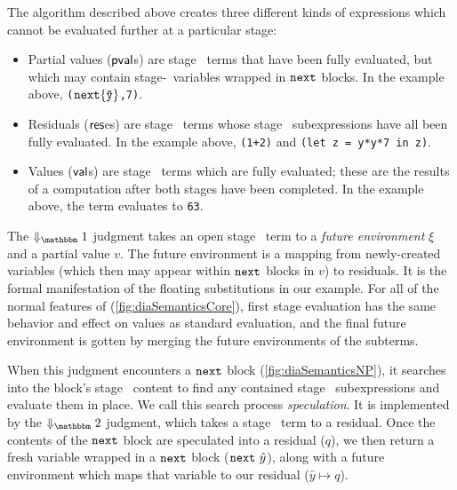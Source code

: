 
The algorithm described above creates three different kinds of expressions which
cannot be evaluated further at a particular stage:
\begin{itemize}
\item 
Partial values ($\mathsf{pval}$s) are stage \bbone\ terms that have been fully evaluated, 
but which may contain stage-\bbtwo\ variables wrapped in ${\tt next}$ blocks. 
In the example above, 
\verb|(|${\tt next} \{\mathtt{\hat y}\}$\verb|,7)|.
\item Residuals ($\mathsf{res}$es) are stage \bbtwo\ terms whose stage \bbone\
subexpressions have all been fully evaluated. In the example above,
\verb|(1+2)| and \verb|(let z = y*y*7 in z)|.
\item Values ($\mathsf{val}$s) are stage \bbtwo\ terms which are fully evaluated; these
are the results of a computation after both stages have been completed. In the
example above, the term evaluates to \verb|63|.
\end{itemize}
The $\redonesym$ judgment takes an open stage \bbone\ term to a {\em future environment} $\xi$ and a partial value $v$.
The future environment is a mapping from newly-created variables 
(which then may appear within ${\tt next}$ blocks in $v$)
to residuals.  It is the formal manifestation of the floating substitutions in our example.
For all of the normal features of \lang (\ref{fig:diaSemanticsCore}), first stage evaluation has the same behavior and effect on values as standard evaluation,
and the final future environment is gotten by merging the future environments of the subterms.

When this judgment encounters a ${\tt next}$ block (\ref{fig:diaSemanticsNP}), it searches into the block's stage \bbtwo\ content to find any contained stage
\bbone\ subexpressions and evaluate them in place.  
We call this search process \emph{speculation}. It is implemented by the $\redtwosym$ judgment, which takes a stage \bbtwo\ term to a residual.
Once the contents of the ${\tt next}$ block are speculated into a residual ($q$), 
we then return a fresh variable wrapped in a ${\tt next}$ block (${\tt next}~\hat y$), 
along with a future environment which maps that variable to our residual ($\hat y \mapsto q$).

